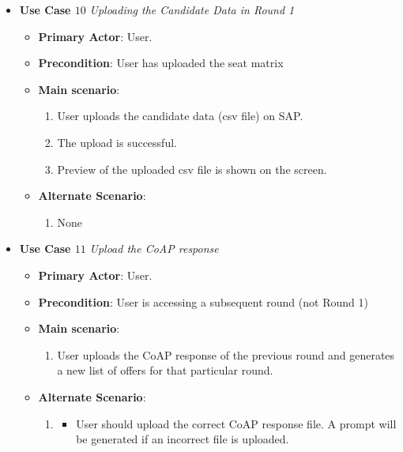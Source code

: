 \documentclass{report}
\begin{document}
\begin{tcolorbox}[colframe=white, colback=lightblue, arc=8pt]
\begin{itemize}
    \item \textbf{Use Case $10$} \textit{Uploading the Candidate Data in Round 1
}\\
    \begin{itemize}
        \item \textbf{Primary Actor}: User.
        \item \textbf{Precondition}: User has uploaded the seat matrix
        \item \textbf{Main scenario}: \begin{enumerate}
            \item User uploads the candidate data (csv file) on SAP. 
            \item The upload is successful.
            \item Preview of the uploaded csv file is shown on the screen.
        \end{enumerate}
       \item \textbf{Alternate Scenario}: 
       \begin{enumerate}
           \item 
           None
       \end{enumerate}
    \end{itemize}
\end{itemize}   
\end{tcolorbox}
\begin{tcolorbox}[colframe=white, colback=lightblue, arc=8pt]

\begin{itemize}
    \item \textbf{Use Case $11$} \textit{Upload the CoAP response
}\\
    \begin{itemize}
        \item \textbf{Primary Actor}: User.
        \item \textbf{Precondition}: User is accessing a subsequent round (not Round 1)
        \item \textbf{Main scenario}: \begin{enumerate}
            \item User uploads the CoAP response of the previous round and generates a new list of offers for that particular round. 
        \end{enumerate}
       \item \textbf{Alternate Scenario}: 
       \begin{enumerate}
           \item 
           \begin{itemize}
               \item User should upload the correct CoAP response file. A prompt will be generated if an incorrect file is uploaded.
           \end{itemize}
       \end{enumerate}
    \end{itemize}
\end{itemize}
    
\end{tcolorbox}
\end{document}
